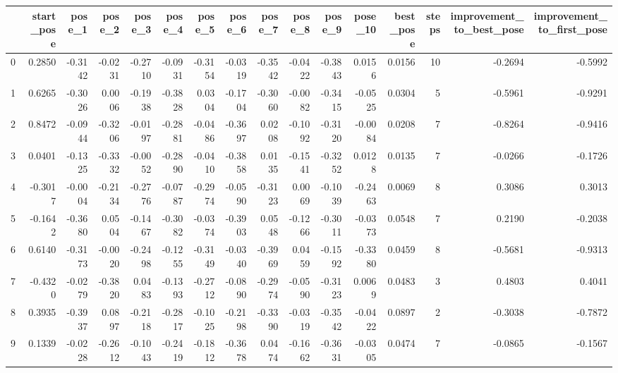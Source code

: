 \begin{tabular}{lrrrrrrrrrrrrrrr}
\toprule
{} &  start\_pose &  pose\_1 &  pose\_2 &  pose\_3 &  pose\_4 &  pose\_5 &  pose\_6 &  pose\_7 &  pose\_8 &  pose\_9 &  pose\_10 &  best\_pose &  steps &  improvement\_to\_best\_pose &  improvement\_to\_first\_pose \\
\midrule
0 &      0.2850 & -0.3142 & -0.0231 & -0.2710 & -0.0931 & -0.3154 & -0.0319 & -0.3542 & -0.0422 & -0.3843 &   0.0156 &     0.0156 &     10 &                   -0.2694 &                    -0.5992 \\
1 &      0.6265 & -0.3026 &  0.0006 & -0.1938 & -0.3828 &  0.0304 & -0.1704 & -0.3060 & -0.0082 & -0.3415 &  -0.0525 &     0.0304 &      5 &                   -0.5961 &                    -0.9291 \\
2 &      0.8472 & -0.0944 & -0.3206 & -0.0197 & -0.2881 & -0.0486 & -0.3697 &  0.0208 & -0.1092 & -0.3120 &  -0.0084 &     0.0208 &      7 &                   -0.8264 &                    -0.9416 \\
3 &      0.0401 & -0.1325 & -0.3332 & -0.0052 & -0.2890 & -0.0410 & -0.3858 &  0.0135 & -0.1541 & -0.3252 &   0.0128 &     0.0135 &      7 &                   -0.0266 &                    -0.1726 \\
4 &     -0.3017 & -0.0004 & -0.2134 & -0.2776 & -0.0787 & -0.2974 & -0.0590 & -0.3123 &  0.0069 & -0.1039 &  -0.2463 &     0.0069 &      8 &                    0.3086 &                     0.3013 \\
5 &     -0.1642 & -0.3680 &  0.0504 & -0.1467 & -0.3082 & -0.0374 & -0.3903 &  0.0548 & -0.1266 & -0.3011 &  -0.0373 &     0.0548 &      7 &                    0.2190 &                    -0.2038 \\
6 &      0.6140 & -0.3173 & -0.0020 & -0.2498 & -0.1255 & -0.3149 & -0.0340 & -0.3969 &  0.0459 & -0.1592 &  -0.3380 &     0.0459 &      8 &                   -0.5681 &                    -0.9313 \\
7 &     -0.4320 & -0.0279 & -0.3820 &  0.0483 & -0.1393 & -0.2712 & -0.0890 & -0.2974 & -0.0590 & -0.3123 &   0.0069 &     0.0483 &      3 &                    0.4803 &                     0.4041 \\
8 &      0.3935 & -0.3937 &  0.0897 & -0.2118 & -0.2817 & -0.1025 & -0.2198 & -0.3390 & -0.0319 & -0.3542 &  -0.0422 &     0.0897 &      2 &                   -0.3038 &                    -0.7872 \\
9 &      0.1339 & -0.0228 & -0.2612 & -0.1043 & -0.2419 & -0.1812 & -0.3678 &  0.0474 & -0.1662 & -0.3631 &  -0.0305 &     0.0474 &      7 &                   -0.0865 &                    -0.1567 \\
\bottomrule
\end{tabular}
